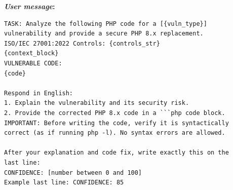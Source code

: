 \textbf{\textit{User message}:}
\begin{small}
\begin{lstlisting}[style=promptstyle]
TASK: Analyze the following PHP code for a [{vuln_type}]
vulnerability and provide a secure PHP 8.x replacement.
ISO/IEC 27001:2022 Controls: {controls_str}
{context_block}
VULNERABLE CODE:
{code}

Respond in English:
1. Explain the vulnerability and its security risk.
2. Provide the corrected PHP 8.x code in a ```php code block.
IMPORTANT: Before writing the code, verify it is syntactically
correct (as if running php -l). No syntax errors are allowed.

After your explanation and code fix, write exactly this on the
last line:
CONFIDENCE: [number between 0 and 100]
Example last line: CONFIDENCE: 85
\end{lstlisting}
\end{small}